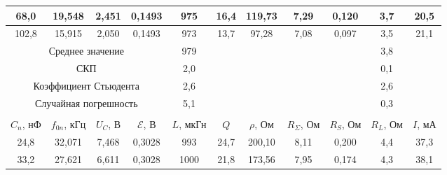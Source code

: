 \documentclass[a4paper, 12pt]{article}
\begin{document}
\begin{table}[H]
\begin{tabular}{|ccccccccccc|}
        \multicolumn{1}{|c|}{68,0} & \multicolumn{1}{c|}{19,548} & \multicolumn{1}{c|}{2,451} & \multicolumn{1}{c|}{0,1493} & \multicolumn{1}{c|}{975} & \multicolumn{1}{c|}{16,4} & \multicolumn{1}{c|}{119,73} & \multicolumn{1}{c|}{7,29} & \multicolumn{1}{c|}{0,120} & \multicolumn{1}{c|}{3,7} & 20,5 \\ \hline
        \multicolumn{1}{|c|}{102,8} & \multicolumn{1}{c|}{15,915} & \multicolumn{1}{c|}{2,050} & \multicolumn{1}{c|}{0,1493} & \multicolumn{1}{c|}{973} & \multicolumn{1}{c|}{13,7} & \multicolumn{1}{c|}{97,28} & \multicolumn{1}{c|}{7,08} & \multicolumn{1}{c|}{0,097} & \multicolumn{1}{c|}{3,5} & 21,1 \\ \hline
        \multicolumn{4}{|c|}{Среднее значение} & \multicolumn{1}{c|}{979} & \multicolumn{4}{c|}{\multirow{4}{*}{}} & \multicolumn{1}{c|}{3,8} & \multirow{4}{*}{} \\ \cline{1-5} \cline{10-10}
        \multicolumn{4}{|c|}{СКП} & \multicolumn{1}{c|}{2,0} & \multicolumn{4}{c|}{} & \multicolumn{1}{c|}{0,1} &  \\ \cline{1-5} \cline{10-10}
        \multicolumn{4}{|c|}{Коэффициент Стьюдента} & \multicolumn{1}{c|}{2,6} & \multicolumn{4}{c|}{} & \multicolumn{1}{c|}{2,6} &  \\ \cline{1-5} \cline{10-10}
        \multicolumn{4}{|c|}{Случайная погрешность} & \multicolumn{1}{c|}{5,1} & \multicolumn{4}{c|}{} & \multicolumn{1}{c|}{0,3} &  \\ \hline
        \multicolumn{11}{c}{} \\ \hline
        \multicolumn{1}{|c|}{$C_n$, нФ} & \multicolumn{1}{c|}{$f_{0n}$, кГц} & \multicolumn{1}{c|}{$U_C$, В} & \multicolumn{1}{c|}{$\mathcal{E}$, В} & \multicolumn{1}{c|}{$L$, мкГн} & \multicolumn{1}{c|}{$Q$} & \multicolumn{1}{c|}{$\rho$, Ом} & \multicolumn{1}{c|}{$R_\Sigma$, Ом} & \multicolumn{1}{c|}{$R_S$, Ом} & \multicolumn{1}{c|}{$R_L$, Ом} & $I$, мА \\ \hline
        \multicolumn{1}{|c|}{24,8} & \multicolumn{1}{c|}{32,071} & \multicolumn{1}{c|}{7,468} & \multicolumn{1}{c|}{0,3028} & \multicolumn{1}{c|}{993} & \multicolumn{1}{c|}{24,7} & \multicolumn{1}{c|}{200,10} & \multicolumn{1}{c|}{8,11} & \multicolumn{1}{c|}{0,200} & \multicolumn{1}{c|}{4,4} & 37,3 \\ \hline
        \multicolumn{1}{|c|}{33,2} & \multicolumn{1}{c|}{27,621} & \multicolumn{1}{c|}{6,611} & \multicolumn{1}{c|}{0,3028} & \multicolumn{1}{c|}{1000} & \multicolumn{1}{c|}{21,8} & \multicolumn{1}{c|}{173,56} & \multicolumn{1}{c|}{7,95} & \multicolumn{1}{c|}{0,174} & \multicolumn{1}{c|}{4,3} & 38,1 \\ \hline

\end{tabular}
\end{table}
\end{document}

